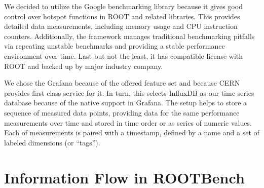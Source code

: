 \documentclass{webofc}
\begin{document}
We decided to utilize the Google benchmarking library because it gives good control over hotspot functions in ROOT and related libraries. This provides detailed data measurements, including memory usage and CPU instruction counters. Additionally, the framework manages traditional benchmarking pitfalls via repeating unstable benchmarks and providing a stable performance environment over time. Last but not the least, it has compatible license with ROOT and backed up by major industry company.

We chose the Grafana because of the offered feature set and because CERN provides first class service for it. In turn, this selects InfluxDB as our time series database because of the native support in Grafana. The setup helps to store a sequence of measured data points, providing data for the same performance measurements over time and stored in time order or as series of numeric values. Each of measurements is paired with a timestamp, defined by a name and a set of labeled dimensions (or “tags”).





\section{Information Flow in ROOTBench}
\end{document}
